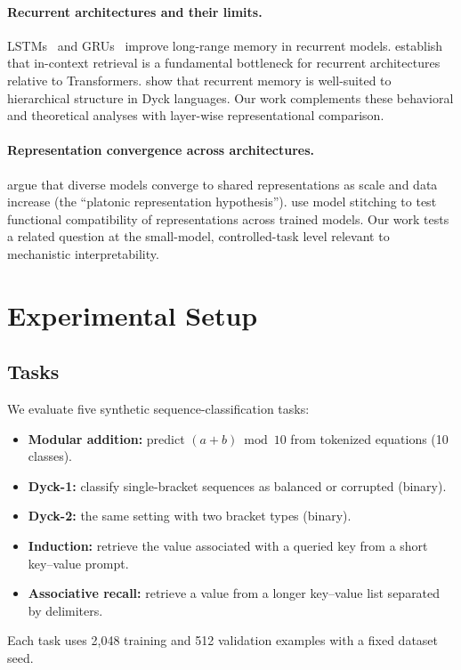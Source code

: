 \documentclass{article}
\begin{document}
\paragraph{Recurrent architectures and their limits.}
LSTMs~\citep{hochreiter1997lstm} and 
GRUs~\citep{cho2014gru} improve long-range memory in recurrent 
models. \citet{wen2024rnns} establish that in-context retrieval is 
a fundamental bottleneck for recurrent architectures relative to 
Transformers. \citet{suzgun2019dyck} show that recurrent memory is 
well-suited to hierarchical structure in Dyck languages. Our work 
complements these behavioral and theoretical analyses with 
layer-wise representational comparison.

\paragraph{Representation convergence across architectures.}
\citet{huh2024platonic} argue that diverse models converge to 
shared representations as scale and data increase (the 
``platonic representation hypothesis''). 
\citet{bansal2021revisiting} use model stitching to test 
functional compatibility of representations across trained 
models. Our work tests a related question at the small-model, 
controlled-task level relevant to mechanistic interpretability.

\section{Experimental Setup}
\label{sec:setup}

\subsection{Tasks}

We evaluate five synthetic sequence-classification tasks:
\begin{itemize}
    \item \textbf{Modular addition:} predict 
    $(a + b) \bmod 10$ from tokenized equations (10 classes).
    \item \textbf{Dyck-1:} classify single-bracket sequences as 
    balanced or corrupted (binary).
    \item \textbf{Dyck-2:} the same setting with two bracket 
    types (binary).
    \item \textbf{Induction:} retrieve the value associated with 
    a queried key from a short key--value prompt.
    \item \textbf{Associative recall:} retrieve a value from a 
    longer key--value list separated by delimiters.
\end{itemize}
Each task uses 2{,}048 training and 512 validation examples with 
a fixed dataset seed.
\end{document}
